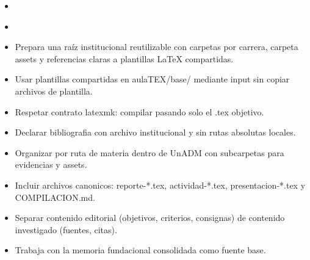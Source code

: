 \documentclass[12pt]{article}
\begin{document}
\begin{itemize}[leftmargin=*]
  \item \\%
  \item \\%
  \item Prepara una raíz institucional reutilizable con carpetas por carrera, carpeta assets y referencias claras a plantillas LaTeX compartidas.
  \item Usar plantillas compartidas en aulaTEX/base/ mediante input sin copiar archivos de plantilla.
  \item Respetar contrato latexmk: compilar pasando solo el .tex objetivo.
  \item Declarar bibliografia con archivo institucional y sin rutas absolutas locales.
  \item Organizar por ruta de materia dentro de UnADM con subcarpetas para evidencias y assets.
  \item Incluir archivos canonicos: reporte-*.tex, actividad-*.tex, presentacion-*.tex y COMPILACION.md.
  \item Separar contenido editorial (objetivos, criterios, consignas) de contenido investigado (fuentes, citas).
  \item Trabaja con la memoria fundacional consolidada como fuente base.
\end{itemize}
\end{document}
